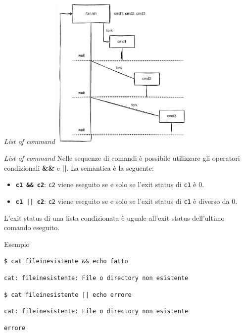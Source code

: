 \documentclass{beamer}
\begin{document}
    \begin{frame}{\textit{List of command}}
        \centering
        \includegraphics[height=7.5cm, keepaspectratio]{images/loc.pdf}
    \end{frame}

    \begin{frame}{\textit{List of command}}
        Nelle sequenze di comandi è possibile utilizzare gli operatori
        condizionali \textbf{\&\&} e \textbf{||}. La semantica è la seguente:
        \begin{itemize}
            \item \texttt{\textbf{c1 \&\& c2}}: \texttt{c2} viene eseguito se e solo se l'exit status di \texttt{c1} è 0.
            \item \texttt{\textbf{c1 || c2}}: \texttt{c2} viene eseguito se e solo se l'exit status di \texttt{c1} è diverso da 0.
        \end{itemize}

        L'exit status di una lista condizionata è uguale all'exit status dell'ultimo comando eseguito.

        \begin{exampleblock}{Esempio}
            \footnotesize

            \texttt{\$ cat fileinesistente \&\&  echo fatto}

            \texttt{cat: fileinesistente: File o directory non esistente}

            \vspace{0.5cm}
            
            \texttt{\$ cat fileinesistente || echo errore}

            \texttt{cat: fileinesistente: File o directory non esistente}

            \texttt{errore}
        \end{exampleblock}
    \end{frame}
\end{document}

